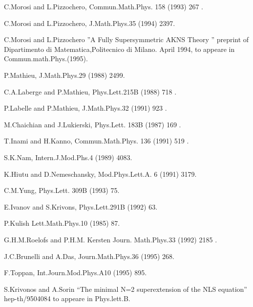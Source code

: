\begin{thebibliography}{99}
\item{} C.Morosi and L.Pizzochero, Commun.Math.Phys. 158 (1993) 267 .

\item{} C.Morosi and L.Pizzochero, J.Math.Phys.35 (1994) 2397.

\item{} C.Morosi and L.Pizzochero  ''A Fully Supersymmetric AKNS Theory ''
        preprint of Dipartimento di Matematica,Politecnico di Milano.
        April 1994, to appeare in Commun.math.Phys.(1995).

\item{} P.Mathieu, J.Math.Phys.29 (1988) 2499.

\item{} C.A.Laberge and P.Mathieu, Phys.Lett.215B (1988) 718 .

\item{} P.Labelle and P.Mathieu, J.Math.Phys.32 (1991) 923 .

\item{} M.Chaichian and J.Lukierski, Phys.Lett. 183B (1987) 169 .

\item{} T.Inami and H.Kanno, Commun.Math.Phys. 136 (1991) 519 .

\item{} S.K.Nam, Intern.J.Mod.Phs.4 (1989) 4083.

\item{} K.Hiutu and D.Nemeschansky, Mod.Phys.Lett.A. 6 (1991) 3179.

\item{} C.M.Yung, Phys.Lett. 309B (1993) 75.

\item{} E.Ivanov and S.Krivons, Phys.Lett.291B (1992) 63.

\item{} P.Kulish Lett.Math.Phys.10 (1985) 87.

\item{} G.H.M.Roelofs and P.H.M. Kersten Journ. Math.Phys.33 (1992) 2185 .

\item{} J.C.Brunelli and A.Das, Journ.Math.Phys.36 (1995) 268.

\item{} F.Toppan, Int.Journ.Mod.Phys.A10 (1995) 895.

\item{} S.Krivonos and A.Sorin ``The minimal N=2 superextension of the NLS
        equation'' hep-th/9504084 to appeare in Phys.lett.B.


\end{thebibliography}
